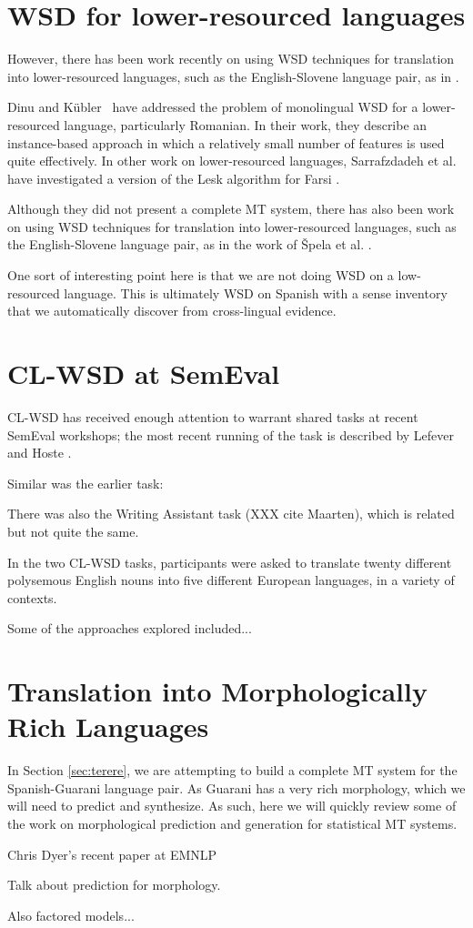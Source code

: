 \section{WSD for lower-resourced languages}
However, there has been work recently on using WSD techniques for translation
into lower-resourced languages, such as the English-Slovene language pair, as
in \cite{vintar-fivser-vrvsvcaj:2012:ESIRMT-HyTra2012}. 

Dinu and Kübler~\cite{Dinu07} have addressed the problem of monolingual WSD for
a lower-resourced language, particularly Romanian. In their work, they describe
an instance-based approach in which a relatively small number of features is
used quite effectively. In other work on lower-resourced languages,
Sarrafzdadeh et al. have investigated a version of the Lesk algorithm
for Farsi \cite{sarrafzdadeh}.

Although they did not present a complete MT system, there has also been work
on using WSD techniques for translation into lower-resourced languages, such as
the English-Slovene language pair, as in
the work of \v{S}pela et al.
\cite{vintar-fivser-vrvsvcaj:2012:ESIRMT-HyTra2012}. 

One sort of interesting point here is that we are not doing WSD on a
low-resourced language. This is ultimately WSD on Spanish with a sense
inventory that we automatically discover from cross-lingual evidence.


\section{CL-WSD at SemEval}
CL-WSD has received enough attention to warrant shared tasks at recent SemEval
workshops; the most recent running of the task is described by Lefever and
Hoste \cite{task10}.

Similar was the earlier task: \cite{lefever-hoste:2009:SEW}

There was also the Writing Assistant task (XXX cite Maarten), which is related
but not quite the same.

In the two CL-WSD tasks, participants were asked to translate twenty different
polysemous English nouns into five different European languages, in a variety
of contexts.

Some of the approaches explored included...


\section{Translation into Morphologically Rich Languages}
In Section \ref{sec:terere}, we are attempting to build a complete MT system
for the Spanish-Guarani language pair. As Guarani has a very rich morphology,
which we will need to predict and synthesize. As such, here we will quickly
review some of the work on morphological prediction and generation for
statistical MT systems.

Chris Dyer's recent paper at EMNLP
\cite{chahuneau:2013:emnlp}

Talk about prediction for morphology.
\cite{toutanova-suzuki-ruopp:2008:ACLMain}

Also factored models...
\cite{yeniterzi-oflazer:2010:ACL}
